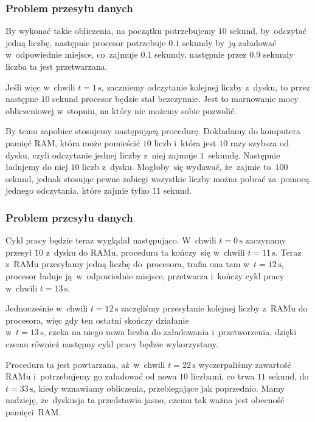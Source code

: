 \documentclass[10pt,t]{beamer}
\begin{document}
\begin{frame}
  \frametitle{Problem przesyłu danych}


  By wykonać takie obliczenia, na początku potrzebujemy $10$ sekund,
  by~odczytać jedną liczbę, następnie procesor potrzebuje $0.1$ sekundy
  by~ją załadować w~odpowiednie miejsce, co~zajmuje $0.1$ sekundy,
  następnie przez $0.9$ sekundy liczba ta jest przetwarzana.

  Jeśli więc w~chwili $t = 1 \, \text{s}$, zaczniemy odczytanie kolejnej
  liczby z~dysku, to przez następne $10$ sekund procesor będzie stał
  bezczynnie. Jest to marnowanie mocy obliczeniowej w~stopniu, na który nie
  możemy sobie pozwolić.

  By temu zapobiec stosujemy następującą procedurę.
  Dokładamy do komputera pamięć RAM, która może pomieścić $10$ liczb
  i~która jest $10$ razy szybsza od dysku, czyli odczytanie jednej
  liczby z~niej zajmuje $1$~sekundę. Następnie ładujemy do niej $10$ liczb
  z~dysku. Mogłoby~się wydawać, że~zajmie to~$100$ sekund, jednak stosując
  pewne zabiegi wszystkie liczby można pobrać za~pomocą \alert{jednego}
  odczytania, które zajmie tylko $11$ sekund.

\end{frame}





\begin{frame}
  \frametitle{Problem przesyłu danych}


  Cykl pracy będzie teraz wyglądał następująco. W~chwili $t = 0 \, \text{s}$
  zaczynamy przesył $10$ z~dysku do RAMu, procedura ta kończy~się
  w~chwili $t = 11 \, \text{s}$. Teraz z~RAMu przesyłamy jedną liczbę
  do~procesora, trafia ona tam w~$t = 12 \, \text{s}$, procesor ładuje
  ją~w~odpowiednie miejsce, przetwarza i~kończy cykl pracy w~chwili
  $t = 13 \, \text{s}$.

  Jednocześnie w~chwili $t = 12 \, \text{s}$ zaczęliśmy przesyłanie
  kolejnej liczby z~RAMu do procesora, więc gdy ten ostatni skończy
  działanie \\
  w~$t = 13 \, \text{s}$, czeka na niego nowa liczba do
  załadowania i~przetworzenia, dzięki czemu również następny cykl pracy
  będzie wykorzystany.

  Procedura ta jest powtarzana, aż~w~chwili $t = 22 \, \text{s}$
  wyczerpaliśmy zawartość RAMu i~potrzebujemy go załadować od nowa
  $10$ liczbami, co trwa $11$ sekund, do $t = 33 \, \text{s}$, kiedy
  wznawiamy obliczenia, przebiegające jak poprzednio. Mamy nadzieję,
  że~dyskusja ta przedstawia jasno, czemu tak ważna jest obecność
  pamięci~RAM.

\end{frame}
\end{document}
